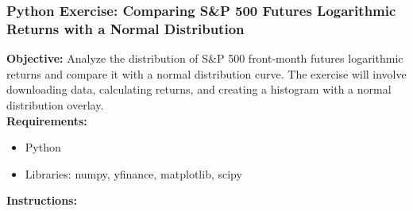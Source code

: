 \documentclass{article}
\begin{document}
\subsubsection{Python Exercise: Comparing S\&P 500 Futures Logarithmic Returns with a Normal Distribution}

\textbf{Objective:} Analyze the distribution of S\&P 500 front-month futures logarithmic returns and compare it with a normal distribution curve. The exercise will involve downloading data, calculating returns, and creating a histogram with a normal distribution overlay. \\

\textbf{Requirements:}
\begin{itemize}
    \item Python
    \item Libraries: numpy, yfinance, matplotlib, scipy
\end{itemize}

\textbf{Instructions:}
\end{document}
